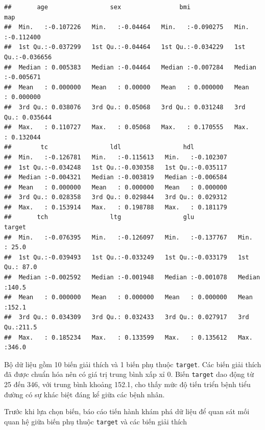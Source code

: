\documentclass[
]{article}
\begin{document}
\begin{verbatim}
##       age                 sex                bmi                 map           
##  Min.   :-0.107226   Min.   :-0.04464   Min.   :-0.090275   Min.   :-0.112400  
##  1st Qu.:-0.037299   1st Qu.:-0.04464   1st Qu.:-0.034229   1st Qu.:-0.036656  
##  Median : 0.005383   Median :-0.04464   Median :-0.007284   Median :-0.005671  
##  Mean   : 0.000000   Mean   : 0.00000   Mean   : 0.000000   Mean   : 0.000000  
##  3rd Qu.: 0.038076   3rd Qu.: 0.05068   3rd Qu.: 0.031248   3rd Qu.: 0.035644  
##  Max.   : 0.110727   Max.   : 0.05068   Max.   : 0.170555   Max.   : 0.132044  
##        tc                 ldl                 hdl           
##  Min.   :-0.126781   Min.   :-0.115613   Min.   :-0.102307  
##  1st Qu.:-0.034248   1st Qu.:-0.030358   1st Qu.:-0.035117  
##  Median :-0.004321   Median :-0.003819   Median :-0.006584  
##  Mean   : 0.000000   Mean   : 0.000000   Mean   : 0.000000  
##  3rd Qu.: 0.028358   3rd Qu.: 0.029844   3rd Qu.: 0.029312  
##  Max.   : 0.153914   Max.   : 0.198788   Max.   : 0.181179  
##       tch                 ltg                 glu                target     
##  Min.   :-0.076395   Min.   :-0.126097   Min.   :-0.137767   Min.   : 25.0  
##  1st Qu.:-0.039493   1st Qu.:-0.033249   1st Qu.:-0.033179   1st Qu.: 87.0  
##  Median :-0.002592   Median :-0.001948   Median :-0.001078   Median :140.5  
##  Mean   : 0.000000   Mean   : 0.000000   Mean   : 0.000000   Mean   :152.1  
##  3rd Qu.: 0.034309   3rd Qu.: 0.032433   3rd Qu.: 0.027917   3rd Qu.:211.5  
##  Max.   : 0.185234   Max.   : 0.133599   Max.   : 0.135612   Max.   :346.0
\end{verbatim}

Bộ dữ liệu gồm 10 biến giải thích và 1 biến phụ thuộc \texttt{target}.
Các biến giải thích đã được chuẩn hóa nên có giá trị trung bình xấp xỉ
0. Biến \texttt{target} dao động từ 25 đến 346, với trung bình khoảng
152.1, cho thấy mức độ tiến triển bệnh tiểu đường có sự khác biệt đáng
kể giữa các bệnh nhân.

Trước khi lựa chọn biến, báo cáo tiến hành khám phá dữ liệu để quan sát
mối quan hệ giữa biến phụ thuộc \texttt{target} và các biến giải thích
\end{document}
